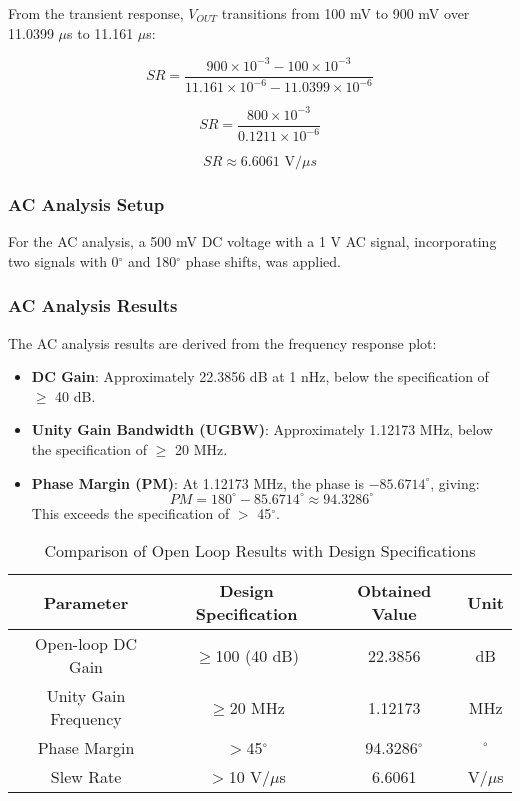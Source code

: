 From the transient response, $V_{OUT}$ transitions from 100 mV to 900 mV over 11.0399 $\mu$s to 11.161 $\mu$s:

\begin{equation}
    SR = \frac{900 \times 10^{-3} - 100 \times 10^{-3}}{11.161 \times 10^{-6} - 11.0399 \times 10^{-6}}
\end{equation}

\begin{equation}
    SR = \frac{800 \times 10^{-3}}{0.1211 \times 10^{-6}}
\end{equation}

\begin{equation}
    SR \approx 6.6061 \text{ V/} \mu s
\end{equation}

\subsubsection{AC Analysis Setup}
For the AC analysis, a 500 mV DC voltage with a 1 V AC signal, incorporating two signals with 0$^\circ$ and 180$^\circ$ phase shifts, was applied.

\subsubsection{AC Analysis Results}
The AC analysis results are derived from the frequency response plot:

\begin{itemize}
    \item \textbf{DC Gain}: Approximately 22.3856 dB at 1 nHz, below the specification of $\geq$ 40 dB.
    \item \textbf{Unity Gain Bandwidth (UGBW)}: Approximately 1.12173 MHz, below the specification of $\geq$ 20 MHz.
    \item \textbf{Phase Margin (PM)}: At 1.12173 MHz, the phase is $-85.6714^\circ$, giving:
    \begin{equation}
        PM = 180^\circ - 85.6714^\circ \approx 94.3286^\circ
    \end{equation}
    This exceeds the specification of $>$ 45$^\circ$.
\end{itemize}

\begin{table}[h]
    \centering
    \caption{Comparison of Open Loop Results with Design Specifications}
    \begin{tabular}{|c|c|c|c|}
        \hline
        \textbf{Parameter} & \textbf{Design Specification} & \textbf{Obtained Value} & \textbf{Unit} \\
        \hline
        Open-loop DC Gain & $\geq$100 (40 dB) & 22.3856 & dB \\
        Unity Gain Frequency & $\geq$20 MHz & 1.12173 & MHz \\
        Phase Margin & $>$45$^\circ$ & 94.3286$^\circ$ & $^\circ$ \\
        Slew Rate & $>$10 V/$\mu$s & 6.6061 & V/$\mu$s \\
        \hline
    \end{tabular}
\end{table}


